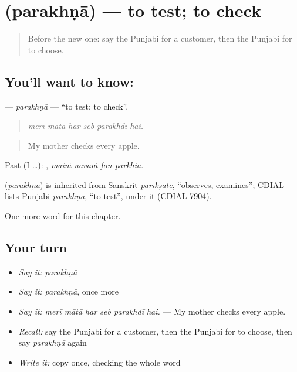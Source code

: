 \section[\texorpdfstring{\pa{ਪਰਖਣਾ} (parakhṇā)}{ਪਰਖਣਾ (parakhṇā)}]{ (parakhṇā) — to test; to check}

\label{lesson:PA-C277-parakhna}



\begin{quote}
Before the new one: say the Punjabi for a customer, then the Punjabi for to choose.
\end{quote}

\subsection*{You'll want to know: }
\textbf{} — \emph{parakhṇā} — \textquotedblleft{}to test; to check\textquotedblright{}.

\begin{quote}
     
\end{quote}

\begin{quote}
\emph{merī mātā har seb parakhdī hai.}
\end{quote}

\begin{quote}
My mother checks every apple.
\end{quote}

Past (I …):    , \emph{maiṁ navāṁ fon parkhiā}.

\begin{cousinweb}
\textbf{} (\emph{parakhṇā}) is inherited from Sanskrit \emph{parīkṣate}, \textquotedblleft{}observes, examines\textquotedblright{}; CDIAL lists Punjabi \emph{parakhṇā}, \textquotedblleft{}to test\textquotedblright{}, under it (CDIAL 7904).
\end{cousinweb}

\begin{grammarlens}[title={What you've built}]
One more word for this chapter.
\end{grammarlens}

\subsection*{Your turn}
\begin{itemize}
\raggedright
  \item \emph{Say it:} \emph{parakhṇā}
  \item \emph{Say it:} \emph{parakhṇā}, once more
  \item \emph{Say it:} \emph{merī mātā har seb parakhdī hai.} — My mother checks every apple.
  \item \emph{Recall:} say the Punjabi for a customer, then the Punjabi for to choose, then say \emph{parakhṇā} again
  \item \emph{Write it:} copy \textbf{} once, checking the whole word
\end{itemize}


